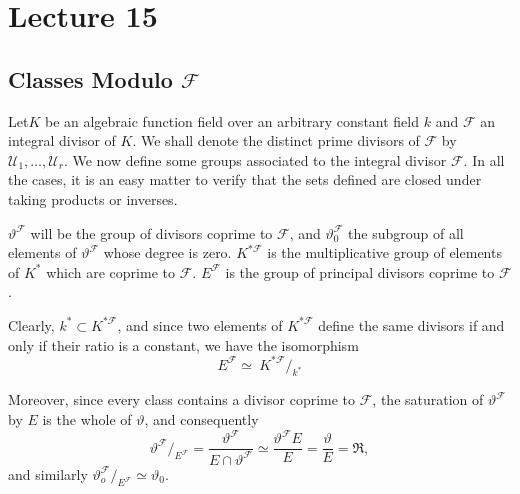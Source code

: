 \chapter{Lecture 15}\label{chap15}%

\setcounter{section}{27}
\section{Classes Modulo \texorpdfstring{$\mathcal{F}$}{F}}\label{chap14:sec28}%

Let\pageoriginale $K$ be an algebraic  function field over an arbitrary constant
field $k$ and $ \mathcal{F} $ an integral divisor of $ K$. We shall
denote the distinct prime divisors of $ \mathcal{F} $ by $
\mathscr{U}_1, \ldots , \mathscr{U}_r $. We now define some groups
associated to the integral divisor $ \mathcal{F} $. In all the cases,
it is an easy matter to verify that the sets defined  are closed under
taking products or inverses. 

$ \vartheta^{\mathcal{F}} $ will be the group of divisors coprime  to
$ \mathcal{F} $, and $ \vartheta^{\mathcal{F}}_0 $ the subgroup of all
elements of $ \vartheta^\mathcal{F} $ whose degree is zero. $ K^{*
  \mathcal{F}} $ is  the multiplicative group of elements of $K^*$
which are coprime to $ \mathcal{F} $.  $ E^\mathcal{F} $ is  the
group of principal divisors coprime to $ \mathcal{F} $. 
 
 Clearly, $ k^* \subset K^{* \mathcal{F}} $, and since two elements of
 $ K^{* \mathcal{F}} $ define the same divisors  if and only if their
 ratio is a constant, we have the isomorphism  
 $$
 E^\mathcal{F} \simeq ~ K^{* \mathcal{F}} /_{k^*}
 $$
 
 Moreover, since every class contains a divisor coprime to $
 \mathcal{F} $, the saturation of  $ \vartheta^\mathcal{F} $ by $E$ is
 the whole of $ \vartheta $, and  consequently  
 $$
 \vartheta^\mathcal{F}/_{E^\mathcal{F}} =
 \frac{\vartheta^\mathcal{F}}{E \cap \vartheta^\mathcal{F}} \simeq
 \frac{\vartheta^\mathcal{F} E}{E} = \frac{\vartheta}{E} = \mathfrak{R}, 
 $$
 and similarly $ \vartheta^\mathcal{F}_o /_{ E^\mathcal{F}} \simeq \vartheta_0 $.
 
